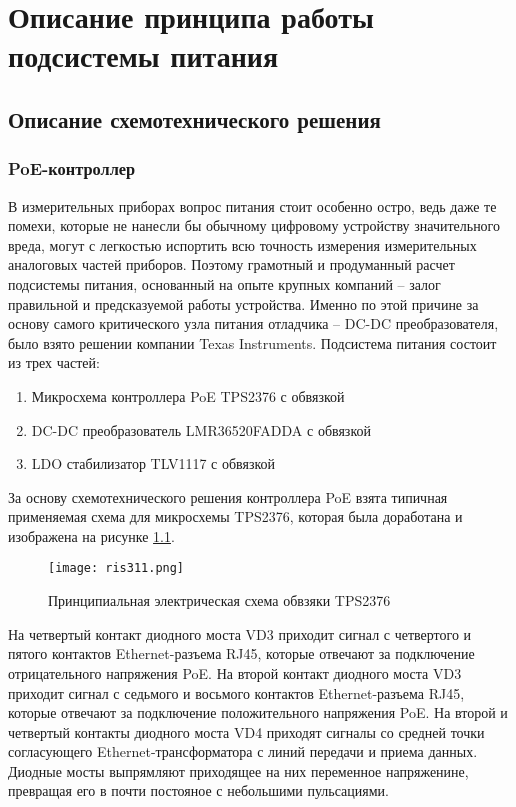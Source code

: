 \chapter{Описание принципа работы подсистемы питания}
\section{Описание схемотехнического решения}
\subsection{PoE-контроллер}
\hspace{1cm} 

В измерительных приборах вопрос питания стоит особенно остро, ведь даже те помехи, которые 
не нанесли бы обычному цифровому устройству значительного вреда, могут с легкостью испортить
всю точность измерения измерительных аналоговых частей приборов. Поэтому грамотный и продуманный расчет 
подсистемы питания, основанный на опыте крупных компаний -- залог правильной и предсказуемой работы устройства.
Именно по этой причине за основу самого критического узла питания отладчика -- DC-DC преобразователя,
было взято решении компании Texas Instruments.
Подсистема питания состоит из трех частей:

\begin{enumerate}
    \item Микросхема контроллера PoE TPS2376 с обвязкой
    \item DC-DC преобразователь LMR36520FADDA с обвязкой 
    \item LDO стабилизатор TLV1117 с обвязкой
\end{enumerate}

За основу схемотехнического решения контроллера PoE взята типичная применяемая схема для
микросхемы TPS2376, которая была доработана и изображена на рисунке \ref{ris:311}.

\begin{figure}[H]
    \centering
    \texttt{[image: ris311.png]}
    \caption{Принципиальная электрическая схема обвзяки TPS2376 }
    \label{ris:311}
\end{figure}

На четвертый контакт диодного моста VD3 приходит сигнал с четвертого и пятого контактов 
Ethernet-разъема RJ45, которые отвечают за подключение отрицательного напряжения PoE.
На второй контакт диодного моста VD3 приходит сигнал с седьмого и восьмого контактов 
Ethernet-разъема RJ45, которые отвечают за подключение положительного напряжения PoE.  
На второй и четвертый контакты диодного моста VD4 приходят сигналы со средней точки согласующего
Ethernet-трансформатора с линий передачи и приема данных. Диодные мосты выпрямляют приходящее
на них переменное напряженине, превращая его в почти постояное с небольшими пульсациями.

